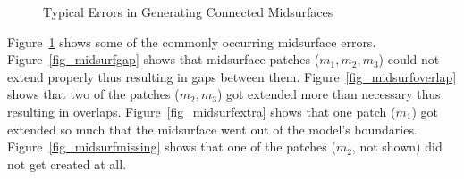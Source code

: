  \begin{figure}[h!]
\centering     %
{} \quad
{} \quad
{} 
\caption{Typical Errors in Generating Connected Midsurfaces}
  \label{fig:midsurfcelljoin:midsurferrors}
\end{figure}
 

Figure~\ref{fig:midsurfcelljoin:midsurferrors} shows some of the commonly occurring midsurface errors. Figure~\ref{fig_midsurfgap} shows that midsurface patches ($m_1,m_2,m_3$) could not extend properly thus resulting in gaps between them. Figure~\ref{fig_midsurfoverlap} shows that two of the patches ($m_2,m_3$) got extended more than necessary thus resulting in overlaps. Figure~\ref{fig_midsurfextra} shows that one patch ($m_1$) got extended so much that the midsurface went out of the model's boundaries. Figure~\ref{fig_midsurfmissing}  shows that one of the patches ($m_2$, not shown) did not get created at all.


